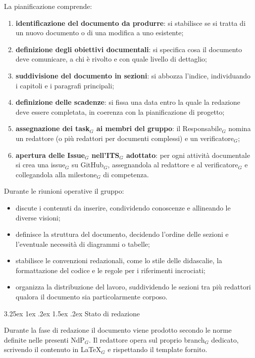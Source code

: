 \documentclass[a4paper, 10pt]{article}
\makeatletter
\renewcommand\paragraph{\@startsection{paragraph}{4}{\z@}%
  {3.25ex \@plus1ex \@minus .2ex}%
  {1.5ex \@plus .2ex}%
  {\normalfont\normalsize\bfseries}}
\makeatother
\begin{document}
La pianificazione comprende:
\begin{enumerate}
    \item \textbf{identificazione del documento da produrre}: si stabilisce se si tratta di un nuovo documento o di una modifica a uno esistente;
    \item \textbf{definizione degli obiettivi documentali}: si specifica cosa il documento deve comunicare, a chi è rivolto e con quale livello di dettaglio;
    \item \textbf{suddivisione del documento in sezioni}: si abbozza l'indice, individuando i capitoli e i paragrafi principali;
    \item \textbf{definizione delle scadenze}: si fissa una data entro la quale la redazione deve essere completata, in coerenza con la pianificazione di progetto;
    \item \textbf{assegnazione dei task$_G$ ai membri del gruppo}: il Responsabile$_G$ nomina un redattore (o più redattori per documenti complessi) e un verificatore$_G$;
    \item \textbf{apertura delle Issue$_G$ nell'ITS$_G$ adottato}: per ogni attività documentale si crea una issue$_G$ su GitHub$_G$, assegnandola al redattore e al verificatore$_G$ e collegandola alla milestone$_G$ di competenza.
\end{enumerate}

Durante le riunioni operative il gruppo:
\begin{itemize}
    \item discute i contenuti da inserire, condividendo conoscenze e allineando le diverse visioni;
    \item definisce la struttura del documento, decidendo l'ordine delle sezioni e l'eventuale necessità di diagrammi o tabelle;
    \item stabilisce le convenzioni redazionali, come lo stile delle didascalie, la formattazione del codice e le regole per i riferimenti incrociati;
    \item organizza la distribuzione del lavoro, suddividendo le sezioni tra più redattori qualora il documento sia particolarmente corposo.
\end{itemize}

\paragraph{Stato di redazione}

Durante la fase di redazione il documento viene prodotto secondo le norme definite nelle presenti NdP$_G$. Il redattore opera sul proprio branch$_G$ dedicato, scrivendo il contenuto in \LaTeX$_G$ e rispettando il template fornito.
\end{document}
